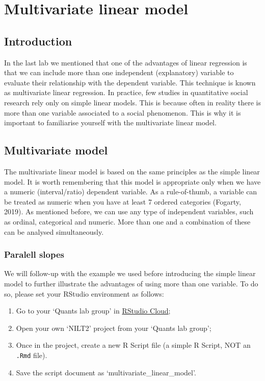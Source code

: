 \documentclass[
]{book}
\providecommand{\tightlist}{%
  \setlength{\itemsep}{0pt}\setlength{\parskip}{0pt}}
\begin{document}
\hypertarget{multi-lm}{%
\chapter{Multivariate linear model}\label{multi-lm}}

\hypertarget{introduction-2}{%
\section{Introduction}\label{introduction-2}}

In the last lab we mentioned that one of the advantages of linear regression is that we can include more than one independent (explanatory) variable to evaluate their relationship with the dependent variable. This technique is known as multivariate linear regression. In practice, few studies in quantitative social research rely only on simple linear models. This is because often in reality there is more than one variable associated to a social phenomenon. This is why it is important to familiarise yourself with the multivariate linear model.

\hypertarget{multivariate-model}{%
\section{Multivariate model}\label{multivariate-model}}

The multivariate linear model is based on the same principles as the simple linear model. It is worth remembering that this model is appropriate only when we have a numeric (interval/ratio) dependent variable. As a rule-of-thumb, a variable can be treated as numeric when you have at least 7 ordered categories (Fogarty, 2019). As mentioned before, we can use any type of independent variables, such as ordinal, categorical and numeric. More than one and a combination of these can be analysed simultaneously.

\hypertarget{paralell-slopes}{%
\subsection{Paralell slopes}\label{paralell-slopes}}

We will follow-up with the example we used before introducing the simple linear model to further illustrate the advantages of using more than one variable. To do so, please set your RStudio environment as follows:

\begin{enumerate}
\def\labelenumi{\arabic{enumi}.}
\tightlist
\item
  Go to your `Quants lab group' in \href{https://rstudio.cloud/}{RStudio Cloud};
\item
  Open your own `NILT2' project from your `Quants lab group';
\item
  Once in the project, create a new R Script file (a simple R Script, NOT an \texttt{.Rmd} file).
\item
  Save the script document as `multivariate\_linear\_model'.
\end{enumerate}
\end{document}
